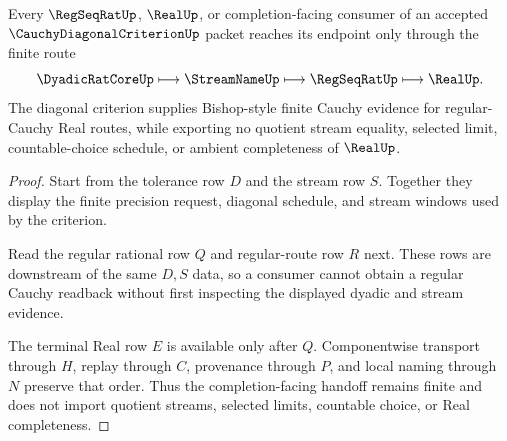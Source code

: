 \begin{theorem}
\label{thm:cauchy-diagonal-criterion-regular-handoff}
Every $\RegSeqRatUp$, $\RealUp$, or completion-facing consumer of an accepted $\CauchyDiagonalCriterionUp$ packet reaches its endpoint only through the finite route
$$
\DyadicRatCoreUp \longmapsto \StreamNameUp \longmapsto \RegSeqRatUp \longmapsto \RealUp .
$$
The diagonal criterion supplies Bishop-style finite Cauchy evidence for regular-Cauchy Real routes, while exporting no quotient stream equality, selected limit, countable-choice schedule, or ambient completeness of $\RealUp$.
\end{theorem}
\begin{proof}
Start from the tolerance row $D$ and the stream row $S$. Together they display the finite precision request, diagonal schedule, and stream windows used by the criterion.

Read the regular rational row $Q$ and regular-route row $R$ next. These rows are downstream of the same $D,S$ data, so a consumer cannot obtain a regular Cauchy readback without first inspecting the displayed dyadic and stream evidence.

The terminal Real row $E$ is available only after $Q$. Componentwise transport through $H$, replay through $C$, provenance through $P$, and local naming through $N$ preserve that order. Thus the completion-facing handoff remains finite and does not import quotient streams, selected limits, countable choice, or Real completeness.
\end{proof}




